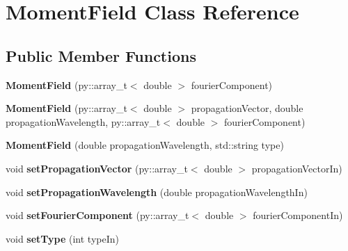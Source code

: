 \hypertarget{class_moment_field}{}\section{Moment\+Field Class Reference}
\label{class_moment_field}
\subsection*{Public Member Functions}
\begin{DoxyCompactItemize}
\item 
\mbox{\label{class_moment_field_acd58e2a2e23e1e39e582ae4e88e45dc6}} 
{\bfseries Moment\+Field} (py\+::array\+\_\+t$<$ double $>$ fourier\+Component)
\item 
\mbox{\label{class_moment_field_ae005006a9fe26e6fe1dab81c599f5a34}} 
{\bfseries Moment\+Field} (py\+::array\+\_\+t$<$ double $>$ propagation\+Vector, double propagation\+Wavelength, py\+::array\+\_\+t$<$ double $>$ fourier\+Component)
\item 
\mbox{\label{class_moment_field_a70920697d0de74a5fcfb4e6097257bcf}} 
{\bfseries Moment\+Field} (double propagation\+Wavelength, std\+::string type)
\item 
\mbox{\label{class_moment_field_a4f9de82602530df70fe1cb51b1aa8ddd}} 
void {\bfseries set\+Propagation\+Vector} (py\+::array\+\_\+t$<$ double $>$ propagation\+Vector\+In)
\item 
\mbox{\label{class_moment_field_acf0e7717dcd56cb27b16470b5c427a37}} 
void {\bfseries set\+Propagation\+Wavelength} (double propagation\+Wavelength\+In)
\item 
\mbox{\label{class_moment_field_ac77e18da1fbff5bfb985fa89153de469}} 
void {\bfseries set\+Fourier\+Component} (py\+::array\+\_\+t$<$ double $>$ fourier\+Component\+In)
\item 
\mbox{\label{class_moment_field_a8daa47b31ec8a2ffbefc880651b3b3ce}} 
void {\bfseries set\+Type} (int type\+In)
\item 
\mbox{\label{class_moment_field_af1e4e338e11035e0ddea8ee84df88243}} 

\end{DoxyCompactItemize}
